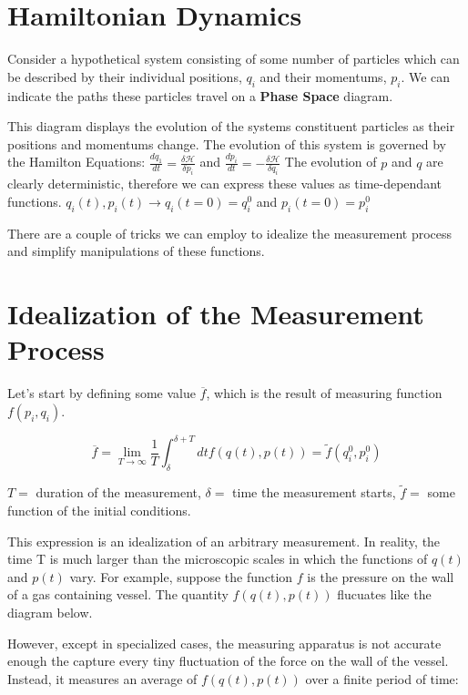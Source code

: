 \documentclass{article}
\newcommand{\pardif}[2]{\frac{\delta#1}{\delta#2}}
\newcommand{\dif}[2]{\frac{d#1}{d#2}}
\begin{document}
\section{Hamiltonian Dynamics}

Consider a hypothetical system consisting of some number of particles which can be described by their individual positions, $q_{i}$ and their momentums, $p_{i}$.  We can indicate the paths these particles travel on a {\bf{Phase Space}} diagram.  


This diagram displays the evolution of the systems constituent particles as their positions and momentums change.  The evolution of this system is governed by the Hamilton Equations:  $\dif{q_{1}}{t} = \pardif{\mathcal{H}}{p_{i}}$ and $\dif{p_{i}}{t}=-\pardif{\mathcal{H}}{q_{i}}$  The evolution of $p$ and $q$ are clearly deterministic, therefore we can express these values as time-dependant functions.  $q_{i}(t), p_{i}(t) \rightarrow q_{i}(t=0)=q_{i}^{0}$ and $p_{i}(t=0)=p_{i}^0$

There are a couple of tricks we can employ to idealize the measurement process and simplify manipulations of these functions.

\section{Idealization of the Measurement Process}

Let's start by defining some value $\overline{f}$, which is the result of measuring function $f(p_{i},q_{i})$.  

$$\overline{f}=\lim_{T\to\infty}\frac{1}{T}\int_{\delta}^{\delta+T}dtf(q(t),p(t))=\widetilde{f}(q_{i}^0,p_{i}^0)$$

$T=$ duration of the measurement, $\delta=$ time the measurement starts, $\widetilde{f}=$ some function of the initial conditions.

This expression is an idealization of an arbitrary measurement.  In reality, the time T is much larger than the microscopic scales in which the functions of $q(t)$ and $p(t)$ vary.  For example, suppose the function $f$ is the pressure on the wall of a gas containing vessel.  The quantity $f(q(t),p(t))$ flucuates like the diagram below.


However, except in specialized cases, the measuring apparatus is not accurate enough the capture every tiny fluctuation of the force on the wall of the vessel.  Instead, it measures an average of $f(q(t),p(t))$ over a finite period of time:
\end{document}
